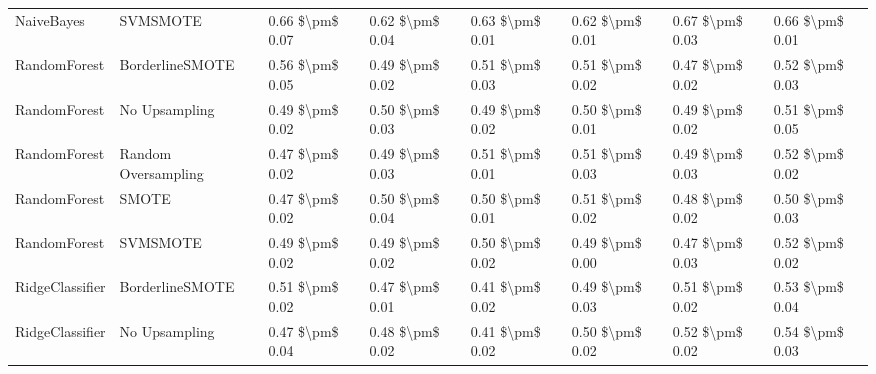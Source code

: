 \begin{tabular}{llllllll}
                     NaiveBayes &                      SVMSMOTE & 0.66 \$\textbackslash pm\$ 0.07 &           0.62 \$\textbackslash pm\$ 0.04 &       0.63 \$\textbackslash pm\$ 0.01 &        0.62 \$\textbackslash pm\$ 0.01 &                         0.67 \$\textbackslash pm\$ 0.03 & 0.66 \$\textbackslash pm\$ 0.01 \\
                   RandomForest &               BorderlineSMOTE & 0.56 \$\textbackslash pm\$ 0.05 &           0.49 \$\textbackslash pm\$ 0.02 &       0.51 \$\textbackslash pm\$ 0.03 &        0.51 \$\textbackslash pm\$ 0.02 &                         0.47 \$\textbackslash pm\$ 0.02 & 0.52 \$\textbackslash pm\$ 0.03 \\
                   RandomForest &                 No Upsampling & 0.49 \$\textbackslash pm\$ 0.02 &           0.50 \$\textbackslash pm\$ 0.03 &       0.49 \$\textbackslash pm\$ 0.02 &        0.50 \$\textbackslash pm\$ 0.01 &                         0.49 \$\textbackslash pm\$ 0.02 & 0.51 \$\textbackslash pm\$ 0.05 \\
                   RandomForest &           Random Oversampling & 0.47 \$\textbackslash pm\$ 0.02 &           0.49 \$\textbackslash pm\$ 0.03 &       0.51 \$\textbackslash pm\$ 0.01 &        0.51 \$\textbackslash pm\$ 0.03 &                         0.49 \$\textbackslash pm\$ 0.03 & 0.52 \$\textbackslash pm\$ 0.02 \\
                   RandomForest &                         SMOTE & 0.47 \$\textbackslash pm\$ 0.02 &           0.50 \$\textbackslash pm\$ 0.04 &       0.50 \$\textbackslash pm\$ 0.01 &        0.51 \$\textbackslash pm\$ 0.02 &                         0.48 \$\textbackslash pm\$ 0.02 & 0.50 \$\textbackslash pm\$ 0.03 \\
                   RandomForest &                      SVMSMOTE & 0.49 \$\textbackslash pm\$ 0.02 &           0.49 \$\textbackslash pm\$ 0.02 &       0.50 \$\textbackslash pm\$ 0.02 &        0.49 \$\textbackslash pm\$ 0.00 &                         0.47 \$\textbackslash pm\$ 0.03 & 0.52 \$\textbackslash pm\$ 0.02 \\
                RidgeClassifier &               BorderlineSMOTE & 0.51 \$\textbackslash pm\$ 0.02 &           0.47 \$\textbackslash pm\$ 0.01 &       0.41 \$\textbackslash pm\$ 0.02 &        0.49 \$\textbackslash pm\$ 0.03 &                         0.51 \$\textbackslash pm\$ 0.02 & 0.53 \$\textbackslash pm\$ 0.04 \\
                RidgeClassifier &                 No Upsampling & 0.47 \$\textbackslash pm\$ 0.04 &           0.48 \$\textbackslash pm\$ 0.02 &       0.41 \$\textbackslash pm\$ 0.02 &        0.50 \$\textbackslash pm\$ 0.02 &                         0.52 \$\textbackslash pm\$ 0.02 & 0.54 \$\textbackslash pm\$ 0.03 \\

\end{tabular}
